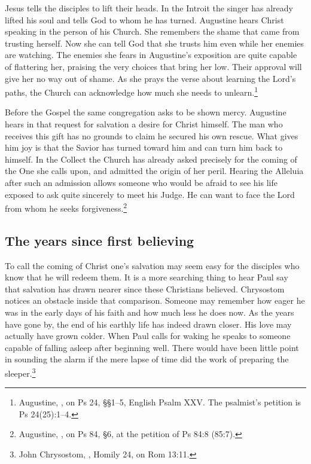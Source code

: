 Jesus tells the disciples to lift their heads. In the Introit the singer has already lifted his soul and tells God to whom he has turned. Augustine hears Christ speaking in the person of his Church. She remembers the shame that came from trusting herself. Now she can tell God that she trusts him even while her enemies are watching. The enemies she fears in Augustine's exposition are quite capable of flattering her, praising the very choices that bring her low. Their approval will give her no way out of shame. As she prays the verse about learning the Lord's paths, the Church can acknowledge how much she needs to unlearn.\footnote{Augustine, , on Ps 24, §§1--5, English Psalm XXV. The psalmist's petition is Ps 24(25):1--4.}

Before the Gospel the same congregation asks to be shown mercy. Augustine hears in that request for salvation a desire for Christ himself. The man who receives this gift has no grounds to claim he secured his own rescue. What gives him joy is that the Savior has turned toward him and can turn him back to himself. In the Collect the Church has already asked precisely for the coming of the One she calls upon, and admitted the origin of her peril. Hearing the Alleluia after such an admission allows someone who would be afraid to see his life exposed to ask quite sincerely to meet his Judge. He can want to face the Lord from whom he seeks forgiveness.\footnote{Augustine, , on Ps 84, §6, at the petition of Ps 84:8 (85:7).}

\subsection{The years since first believing}

To call the coming of Christ one's salvation may seem easy for the disciples who know that he will redeem them. It is a more searching thing to hear Paul say that salvation has drawn nearer since these Christians believed. Chrysostom notices an obstacle inside that comparison. Someone may remember how eager he was in the early days of his faith and how much less he does now. As the years have gone by, the end of his earthly life has indeed drawn closer. His love may actually have grown colder. When Paul calls for waking he speaks to someone capable of falling asleep after beginning well. There would have been little point in sounding the alarm if the mere lapse of time did the work of preparing the sleeper.\footnote{John Chrysostom, , Homily 24, on Rom 13:11.}

